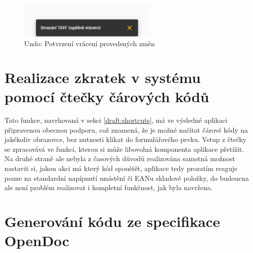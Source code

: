 \begin{figure}[h]
\includegraphics[width=0.6\textwidth]{../png/app/undo_snack_after.png}
\caption{Undo: Potvrzení vrácení provedených změn} \label{picture:undo-after}
\end{figure}


\section{Realizace zkratek v systému pomocí čtečky čárových kódů}\label{implementation:shortcuts}

Tato funkce, navrhovaná v sekci \ref{draft:shortcuts}, má ve výsledné aplikaci připravenou obecnou podporu, což znamená, že je možné načítat čárové kódy na jakékoliv obrazovce, bez nutnosti klikat do formulářového prvku. Vstup z čtečky se zpracovává ve funkci, kterou si může libovolná komponenta aplikace přetížit. Na druhé straně ale nebyla z časových důvodů realizována samotná možnost nastavit si, jakou akci má který kód spouštět, aplikace tedy prozatím reaguje pouze na standardní napípnutí umístění či EANu skladové položky, do budoucna ale není problém realizovat i kompletní funkčnost, jak byla navržena.


\section{Generování kódu ze specifikace OpenDoc}\label{implementation:codegen}

